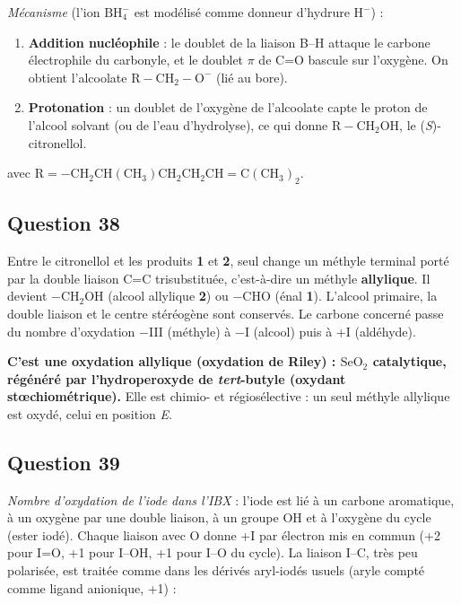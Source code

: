 \documentclass[11pt,a4paper]{article}
\providecommand{\tightlist}{\setlength{\itemsep}{0pt}\setlength{\parskip}{0pt}}
\newcommand{\equationajustee}[1]{%
  \sbox{\boiteequation}{$\displaystyle #1$}%
  \ifdim\wd\boiteequation>\linewidth
    \[\resizebox{\linewidth}{!}{\usebox{\boiteequation}}\]%
  \else
    \[#1\]%
  \fi}
\begin{document}
\emph{Mécanisme} (l'ion \(\mathrm{BH_4^-}\) est modélisé comme donneur d'hydrure \(\mathrm{H^-}\)) :

\begin{enumerate}
\def\labelenumi{\arabic{enumi}.}
\tightlist
\item
  \textbf{Addition nucléophile} : le doublet de la liaison B--H attaque le carbone électrophile du carbonyle, et le doublet \(\pi\) de C=O bascule sur l'oxygène. On obtient l'alcoolate \(\mathrm{R{-}CH_2{-}O^-}\) (lié au bore).
\item
  \textbf{Protonation} : un doublet de l'oxygène de l'alcoolate capte le proton de l'alcool solvant (ou de l'eau d'hydrolyse), ce qui donne \(\mathrm{R{-}CH_2OH}\), le (\emph{S})-citronellol.
\end{enumerate}

\equationajustee{\mathrm{R{-}CHO}\xrightarrow{\ \mathrm{H^-}\ (\mathrm{BH_4^-})\ }\mathrm{R{-}CH_2{-}O^-}\xrightarrow{\ \mathrm{EtOH}\ }\mathrm{R{-}CH_2OH}+\mathrm{EtO^-}}

avec \(\mathrm R=-\mathrm{CH_2CH(CH_3)CH_2CH_2CH{=}C(CH_3)_2}\).

\hypertarget{question-38}{%
\subsection{Question 38}\label{question-38}}

Entre le citronellol et les produits \textbf{1} et \textbf{2}, seul change un méthyle terminal porté par la double liaison C=C trisubstituée, c'est-à-dire un méthyle \textbf{allylique}. Il devient \(\mathrm{-CH_2OH}\) (alcool allylique \textbf{2}) ou \(\mathrm{-CHO}\) (énal \textbf{1}). L'alcool primaire, la double liaison et le centre stéréogène sont conservés. Le carbone concerné passe du nombre d'oxydation −III (méthyle) à −I (alcool) puis à +I (aldéhyde).

\textbf{C'est une oxydation allylique (oxydation de Riley) : \(\mathrm{SeO_2}\) catalytique, régénéré par l'hydroperoxyde de \emph{tert}-butyle (oxydant stœchiométrique).} Elle est chimio- et régiosélective : un seul méthyle allylique est oxydé, celui en position \emph{E}.

\hypertarget{question-39}{%
\subsection{Question 39}\label{question-39}}

\emph{Nombre d'oxydation de l'iode dans l'IBX} : l'iode est lié à un carbone aromatique, à un oxygène par une double liaison, à un groupe OH et à l'oxygène du cycle (ester iodé). Chaque liaison avec O donne +I par électron mis en commun (+2 pour I=O, +1 pour I--OH, +1 pour I--O du cycle). La liaison I--C, très peu polarisée, est traitée comme dans les dérivés aryl-iodés usuels (aryle compté comme ligand anionique, +1) :
\end{document}
